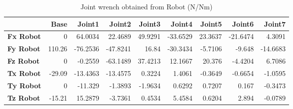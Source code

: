\begin{table}[h!]
	\centering
	\caption{Joint wrench obtained from Robot (N/Nm)}
	\label{wrech_Robot_Pose2}
	\begin{tabular}{|l|r|r|r|r|r|r|r|r|}
		\hline
		\textbf{} & \textbf{Base} & \textbf{Joint1}  & \textbf{Joint2}  & \textbf{Joint3}  & \textbf{Joint4}  & \textbf{Joint5}  & \textbf{Joint6}  & \textbf{Joint7} \\ \hline
		\textbf{Fx Robot}  & 0        & 64.0034        & 22.4689        & 49.9291        & -33.6529        & 23.3637        & -21.6474        & 4.3091 \\ \hline
		\textbf{Fy Robot}  & 110.26        & -76.2536        & -47.8241        & 16.84        & -30.3434        & -5.7106        & -9.648        & -14.6683 \\ \hline
		\textbf{Fz Robot}  & 0        & -0.2559        & -63.1489        & 37.4213        & 12.1667        & 20.376        & -4.4204        & 6.7086 \\ \hline
		\textbf{Tx Robot}  & -29.09        & -13.4363        & -13.4575        & 0.3224        & 1.4061        & -0.3649        & -0.6654        & -1.0595 \\ \hline
		\textbf{Ty Robot}  & 0        & -11.329        & -1.3893        & -1.9634        & 0.6292        & 0.7207        & 0.167        & -0.3473 \\ \hline
		\textbf{Tz Robot}  & -15.21        & 15.2879        & -3.7361        & 0.4534        & 5.4584        & 0.6204        & 2.894        & -0.0789 \\ \hline
	\end{tabular}
\end{table}

